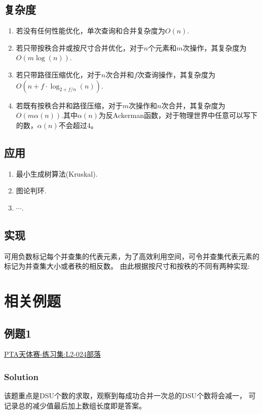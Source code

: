 \documentclass{article}
\begin{document}
    \subsection{复杂度}
    \begin{enumerate}
        \item 若没有任何性能优化，单次查询和合并复杂度为$O(n)$.
        \item 若只带按秩合并或按尺寸合并优化，对于$n$个元素和$m$次操作，其复杂度为$O(m\log(n))$.
        \item 若只带路径压缩优化，对于$n$次合并和$f$次查询操作，其复杂度为$O(n + f\cdot \log_{2+f/n}(n))$.
        \item 若既有按秩合并和路径压缩，对于$m$次操作和$n$次合并，其复杂度为$O(m \alpha(n))$.其中$\alpha(n)$为反Ackerman函数，对于物理世界中任意可以写下的数，$\alpha(n)$不会超过4。
    \end{enumerate}

    \subsection{应用}
    \begin{enumerate}
        \item 最小生成树算法(Kruskal).
        \item 图论判环.
        \item $\cdots$.
    \end{enumerate}

    \subsection{实现}
    可用负数标记每个并查集的代表元素，为了高效利用空间，可令并查集代表元素的标记为并查集大小或者秩的相反数。
    由此根据按尺寸和按秩的不同有两种实现:
    
    

    \section{相关例题}
    \subsection{例题1}
    \href{https://pintia.cn/problem-sets/994805046380707840/exam/problems/994805056736444416}{PTA天体赛-练习集:L2-024部落}
    \subsubsection{Solution}
    该题重点是DSU个数的求取，观察到每成功合并一次总的DSU个数将会减一，
    可记录总的减少值最后加上数组长度即是答案。
\end{document}
